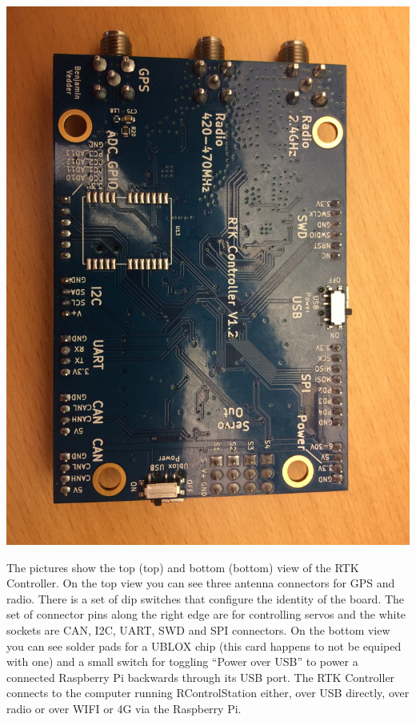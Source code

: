 \documentclass[12pt]{article} %
\begin{document}
\begin{minipage}{0.33\textwidth}
  \noindent \includegraphics[width=\textwidth]{./photos/RTKControl1.JPG}
\end{minipage}
\begin{minipage}{0.66\textwidth} %
  The pictures show the top (top) and bottom (bottom) view of the RTK
  Controller. On the top view you can see three antenna connectors for
  GPS and radio.  There is a set of dip switches that configure the
  identity of the board. The set of connector pins along the right
  edge are for controlling servos and the white sockets are CAN, I2C,
  UART, SWD and SPI connectors.  On the bottom view you can see solder
  pads for a UBLOX chip (this card happens to not be equiped with one)
  and a small switch for toggling ``Power over USB'' to power a
  connected Raspberry Pi backwards through its USB port.  The RTK
  Controller connects to the computer running RControlStation either,
  over USB directly, over radio or over WIFI or 4G via the Raspberry
  Pi.
\end{minipage}
\end{document}
